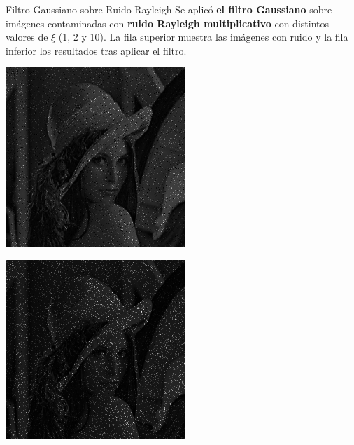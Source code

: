 \documentclass{beamer}
\begin{document}
\begin{frame}[fragile]{Filtro Gaussiano sobre Ruido Rayleigh}
	\justifying
	\footnotesize
	Se aplicó \textcolor{unahurverde}{\textbf{el filtro Gaussiano}} sobre imágenes contaminadas con \textcolor{unahurverde}{\textbf{ruido Rayleigh multiplicativo}}  
	con distintos valores de $\xi$ (1, 2 y 10).  
	La fila superior muestra las imágenes con ruido y la fila inferior los resultados tras aplicar el filtro.
	
	\centering
	\begin{minipage}{0.25\linewidth}
		\centering
		\includegraphics[width=\linewidth]{../results/lena_rayleigh_xi1}
	\end{minipage}\hfill
	\begin{minipage}{0.25\linewidth}
		\centering
		\includegraphics[width=\linewidth]{../results/lena_rayleigh_xi2}

\end{minipage}
\end{frame}
\end{document}
